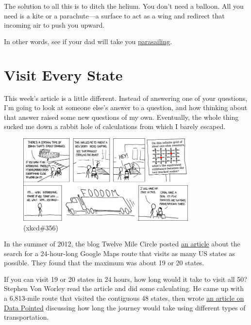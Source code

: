{{The solution to all this is to ditch the helium. You don't need a balloon. All you need is a kite or a parachute—a surface to act as a wing and redirect that incoming air to push you upward.}

{In other words, see if your dad will take you \href{https://www.youtube.com/results?search\_query=parasailing}{parasailing}.}

{
\chapter{Visit Every State}
}

\hfill{}

{This week's article is a little different. Instead of answering one of your questions, I'm going to look at someone else's answer to a question, and how thinking about that answer raised some new questions of my own. Eventually, the whole thing sucked me down a rabbit hole of calculations from which I barely escaped.}

\begin{figure}[!htbp]
\centering
\includegraphics[scale=0.5, max width=0.8\textwidth]{imgs/a/113/nerd_sniping.png}
\caption{(xkcd\#356)}
\end{figure}

{In the summer of 2012, the blog Twelve Mile Circle posted \href{http://www.datapointed.net/2012/08/fastest-route-to-visit-all-fifty-united-states/}{an article} about the search for a 24-hour-long Google Maps route that visits as many US states as possible. They found that the maximum was about 19 or 20 states.}

{If you can visit 19 or 20 states in 24 hours, how long would it take to visit all 50? Stephen Von Worley read the article and did some calculating. He came up with a 6,813-mile route that visited the contiguous 48 states, then wrote \href{http://www.datapointed.net/2012/08/fastest-route-to-visit-all-fifty-united-states/}{an article on Data Pointed} discussing how long the journey would take using different types of transportation.}

}

